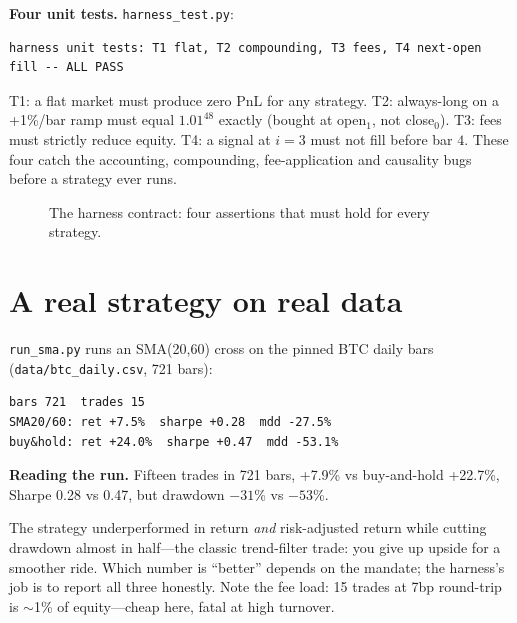 \begin{example}\label{ex:unittest}
\textbf{Four unit tests.} \texttt{harness\_test.py}:
\begin{lstlisting}[numbers=none]
harness unit tests: T1 flat, T2 compounding, T3 fees, T4 next-open fill -- ALL PASS
\end{lstlisting}
\begin{solution}
T1: a flat market must produce zero PnL for any strategy. T2: always-long on a +1\%/bar
ramp must equal $1.01^{48}$ exactly (bought at open$_1$, not close$_0$). T3: fees must
strictly reduce equity. T4: a signal at $i{=}3$ must not fill before bar $4$. These four
catch the accounting, compounding, fee-application and causality bugs before a strategy
ever runs.
\end{solution}
\end{example}

\begin{figure}[htbp]\centering

\caption{The harness contract: four assertions that must hold for every strategy.}
\label{fig:tests}
\end{figure}

\section{A real strategy on real data}\label{sec:realbt}

\texttt{run\_sma.py} runs an SMA(20,60) cross on the pinned BTC daily bars
(\texttt{data/btc\_daily.csv}, 721 bars):
\begin{lstlisting}[numbers=none]
bars 721  trades 15
SMA20/60: ret +7.5%  sharpe +0.28  mdd -27.5%
buy&hold: ret +24.0%  sharpe +0.47  mdd -53.1%
\end{lstlisting}

\begin{example}\label{ex:sma}
\textbf{Reading the run.} Fifteen trades in 721 bars, +7.9\% vs buy-and-hold +22.7\%,
Sharpe 0.28 vs 0.47, but drawdown $-31$\% vs $-53$\%.
\begin{solution}
The strategy underperformed in return \emph{and} risk-adjusted return while cutting
drawdown almost in half---the classic trend-filter trade: you give up upside for a
smoother ride. Which number is ``better'' depends on the mandate; the harness's job is to
report all three honestly. Note the fee load: 15 trades at 7bp round-trip is $\sim$1\% of
equity---cheap here, fatal at high turnover.
\end{solution}
\end{example}


